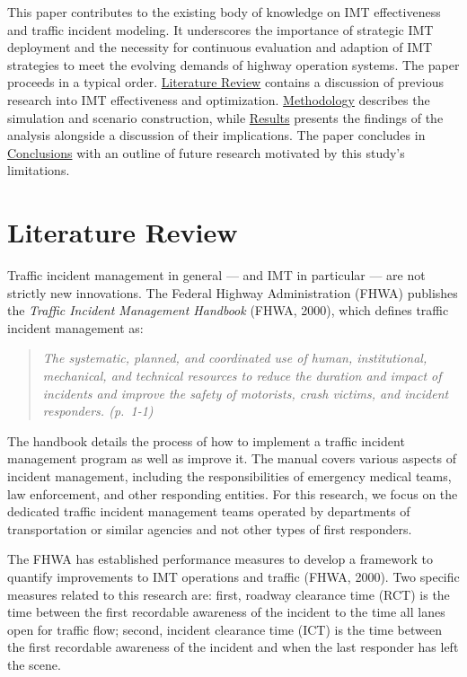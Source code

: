 \documentclass[fancy, oneside, mastersfancy, ms]{byuthesis}
\begin{document}
This paper contributes to the existing body of knowledge on IMT
effectiveness and traffic incident modeling. It underscores the
importance of strategic IMT deployment and the necessity for continuous
evaluation and adaption of IMT strategies to meet the evolving demands
of highway operation systems. The paper proceeds in a typical order.
\protect\hyperlink{sec-literature}{Literature Review} contains a
discussion of previous research into IMT effectiveness and optimization.
\protect\hyperlink{sec-methods}{Methodology} describes the simulation
and scenario construction, while
\protect\hyperlink{sec-results}{Results} presents the findings of the
analysis alongside a discussion of their implications. The paper
concludes in \protect\hyperlink{sec-conclusions}{Conclusions} with an
outline of future research motivated by this study's limitations.


\hypertarget{sec-literature}{%
\chapter{Literature Review}\label{sec-literature}}

Traffic incident management in general --- and IMT in particular --- are
not strictly new innovations. The Federal Highway Administration (FHWA)
publishes the \emph{Traffic Incident Management Handbook} (FHWA, 2000),
which defines traffic incident management as:

\begin{quote}
\emph{The systematic, planned, and coordinated use of human,
institutional, mechanical, and technical resources to reduce the
duration and impact of incidents and improve the safety of motorists,
crash victims, and incident responders. (p.~1-1)}
\end{quote}

The handbook details the process of how to implement a traffic incident
management program as well as improve it. The manual covers various
aspects of incident management, including the responsibilities of
emergency medical teams, law enforcement, and other responding entities.
For this research, we focus on the dedicated traffic incident management
teams operated by departments of transportation or similar agencies and
not other types of first responders.

The FHWA has established performance measures to develop a framework to
quantify improvements to IMT operations and traffic (FHWA, 2000). Two
specific measures related to this research are: first, roadway clearance
time (RCT) is the time between the first recordable awareness of the
incident to the time all lanes open for traffic flow; second, incident
clearance time (ICT) is the time between the first recordable awareness
of the incident and when the last responder has left the scene.
\end{document}
